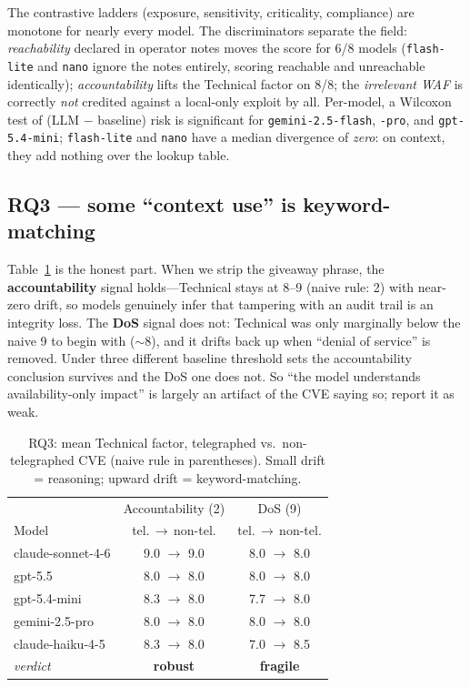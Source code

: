 \documentclass[10pt,twocolumn]{article}
\newcommand{\code}[1]{\texttt{\small #1}}
\begin{document}
The contrastive ladders (exposure, sensitivity, criticality, compliance) are
monotone for nearly every model. The discriminators separate the field:
\emph{reachability} declared in operator notes moves the score for 6/8 models
(\code{flash-lite} and \code{nano} ignore the notes entirely, scoring reachable
and unreachable identically); \emph{accountability} lifts the Technical factor on
8/8; the \emph{irrelevant WAF} is correctly \emph{not} credited against a
local-only exploit by all. Per-model, a Wilcoxon test of (LLM $-$ baseline) risk
is significant for \code{gemini-2.5-flash}, \code{-pro}, and \code{gpt-5.4-mini};
\code{flash-lite} and \code{nano} have a median divergence of
\emph{zero}: on context, they add nothing over the lookup table.

\subsection{RQ3 --- some ``context use'' is keyword-matching}
Table~\ref{tab:ct} is the honest part. When we strip the giveaway phrase, the
\textbf{accountability} signal holds---Technical stays at 8--9 (naive rule: 2)
with near-zero drift, so models genuinely infer that tampering with an audit
trail is an integrity loss. The \textbf{DoS} signal does not: Technical was only
marginally below the naive 9 to begin with ($\sim$8), and it drifts back up when
``denial of service'' is removed. Under three different baseline threshold sets
the accountability conclusion survives and the DoS one does not. So ``the model
understands availability-only impact'' is largely an artifact of the CVE saying
so; report it as weak.

\begin{table}[t]\centering\small
\caption{RQ3: mean Technical factor, telegraphed vs.\ non-telegraphed CVE
(naive rule in parentheses). Small drift = reasoning; upward drift = keyword-matching.}
\label{tab:ct}
\begin{tabular}{@{}lcc@{}}
\toprule
 & Accountability (2) & DoS (9) \\
Model & tel.\,$\to$\,non-tel. & tel.\,$\to$\,non-tel. \\
\midrule
claude-sonnet-4-6 & 9.0 $\to$ 9.0 & 8.0 $\to$ 8.0 \\
gpt-5.5           & 8.0 $\to$ 8.0 & 8.0 $\to$ 8.0 \\
gpt-5.4-mini      & 8.3 $\to$ 8.0 & 7.7 $\to$ 8.0 \\
gemini-2.5-pro    & 8.0 $\to$ 8.0 & 8.0 $\to$ 8.0 \\
claude-haiku-4-5  & 8.3 $\to$ 8.0 & 7.0 $\to$ 8.5 \\
\midrule
\emph{verdict} & \textbf{robust} & \textbf{fragile} \\
\bottomrule
\end{tabular}
\end{table}
\end{document}
